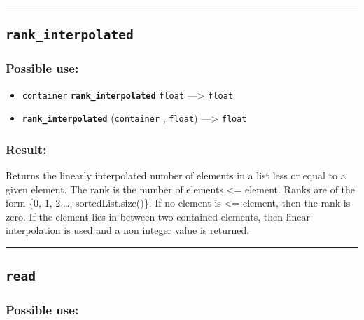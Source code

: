 \documentclass[]{book}
\providecommand{\tightlist}{%
  \setlength{\itemsep}{0pt}\setlength{\parskip}{0pt}}
\theoremstyle{definition}
\theoremstyle{definition}
\theoremstyle{definition}
\theoremstyle{remark}
\begin{document}
\begin{center}\rule{0.5\linewidth}{\linethickness}\end{center}

\subsection{\texorpdfstring{\texttt{rank\_interpolated}}{rank\_interpolated}}\label{rank_interpolated}

\subsubsection{Possible use:}\label{possible-use-428}

\begin{itemize}
\tightlist
\item
  \texttt{container} \textbf{\texttt{rank\_interpolated}} \texttt{float}
  ---\textgreater{} \texttt{float}
\item
  \textbf{\texttt{rank\_interpolated}} (\texttt{container} ,
  \texttt{float}) ---\textgreater{} \texttt{float}
\end{itemize}

\subsubsection{Result:}\label{result-414}

Returns the linearly interpolated number of elements in a list less or
equal to a given element. The rank is the number of elements
\textless{}= element. Ranks are of the form \{0, 1, 2,\ldots{},
sortedList.size()\}. If no element is \textless{}= element, then the
rank is zero. If the element lies in between two contained elements,
then linear interpolation is used and a non integer value is returned.

\begin{center}\rule{0.5\linewidth}{\linethickness}\end{center}

\subsection{\texorpdfstring{\texttt{read}}{read}}\label{read}

\subsubsection{Possible use:}\label{possible-use-429}
\end{document}

